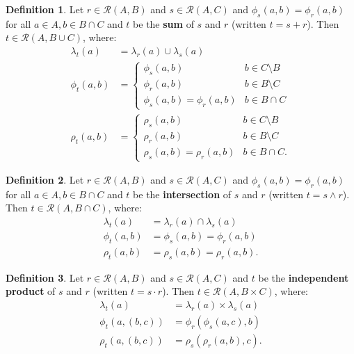 \documentclass{article}
\theoremstyle{definition}
\newtheorem{definition}{Definition}[subsection]
\theoremstyle{plain}
\def\rule{\mathcal{R}}
\begin{document}
\begin{definition}
  Let $ r \in \rule (A, B) $
  and $ s \in \rule (A, C) $
  and $ \phi_s (a, b) = \phi_r (a, b) $
  for all $ a \in A, b \in B \cap C $
  and $ t $ be the \textbf{sum} of $ s $ and $ r $
  (written $ t = s + r $).
  Then $ t \in \rule (A, B \cup C) $, where:
  \begin{align}
    \lambda_t (a)    & = \lambda_r (a) \cup \lambda_s (a) \\
       \phi_t (a, b) & = \begin {cases}
                           \phi_s (a, b)                 & b \in C \setminus B \\
                           \phi_r (a, b)                 & b \in B \setminus C \\
                           \phi_s (a, b) = \phi_r (a, b) & b \in B \cap C
                         \end{cases} \\
        \rho_t (a, b) & = \begin {cases}
                           \rho_s (a, b)                 & b \in C \setminus B \\
                           \rho_r (a, b)                 & b \in B \setminus C \\
                           \rho_s (a, b) = \rho_r (a, b) & b \in B \cap C.
                         \end{cases} 
  \end{align}
\end{definition}

\begin{definition}
  Let $ r \in \rule (A, B) $
  and $ s \in \rule (A, C) $
  and $ \phi_s (a, b) = \phi_r (a, b) $
  for all $ a \in A, b \in B \cap C $
  and $ t $ be the \textbf{intersection} of $ s $ and $ r $
  (written $ t = s \wedge r $).
  Then $ t \in \rule (A, B \cap C) $, where:
  \begin{align}
    \lambda_t (a)    & = \lambda_r (a) \cap \lambda_s (a) \\
       \phi_t (a, b) & = \phi_s (a, b) = \phi_r (a, b) \\
       \rho_t (a, b) & = \rho_s (a, b) = \rho_r (a, b).
  \end{align}
\end{definition}

\begin{definition}
  Let $ r \in \rule (A, B) $
  and $ s \in \rule (A, C) $
  and $ t $ be the \textbf{independent product} of $ s $ and $ r $
  (written $ t = s \cdot r $).
  Then $ t \in \rule (A, B \times C) $, where:
  \begin{align}
    \lambda_t (a)         & = \lambda_r (a) \times \lambda_s (a) \\
       \phi_t (a, (b, c)) & =    \phi_r (\phi_s (a, c), b) \\
       \rho_t (a, (b, c)) & =    \rho_s (\rho_r (a, b), c).
  \end{align}
\end{definition}
\end{document}
